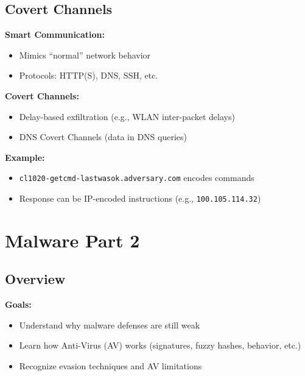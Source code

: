 \subsection{Covert Channels}
{
\textbf{Smart Communication:}
\begin{itemize}[noitemsep]
  \item Mimics “normal” network behavior
  \item Protocols: HTTP(S), DNS, SSH, etc.
\end{itemize}

\textbf{Covert Channels:}
\begin{itemize}[noitemsep]
  \item Delay-based exfiltration (e.g., WLAN inter-packet delays)
  \item DNS Covert Channels (data in DNS queries)
\end{itemize}

\textbf{Example:}
\begin{itemize}[noitemsep]
  \item \texttt{cl1020-getcmd-lastwasok.adversary.com} encodes commands
  \item Response can be IP-encoded instructions (e.g., \texttt{100.105.114.32})
\end{itemize}
}

\section{Malware Part 2}

\subsection{Overview}
{
\textbf{Goals:}
\begin{itemize}[noitemsep]
  \item Understand why malware defenses are still weak
  \item Learn how Anti-Virus (AV) works (signatures, fuzzy hashes, behavior, etc.)
  \item Recognize evasion techniques and AV limitations
\end{itemize}
}

